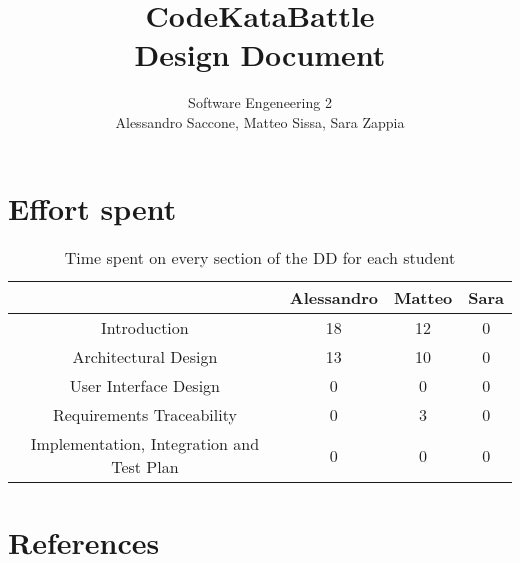 \documentclass[12pt,a4paper]{article}
\title{CodeKataBattle\\ Design Document}
\author{Software Engeneering 2\\
       Alessandro Saccone, Matteo Sissa, Sara Zappia}
\begin{document}
\maketitle

\newpage
\tableofcontents











\section{Effort spent}
\begin{table}[h]
  \centering
  \begin{tabular}{|c|c|c|c|}
    \hline
      & Alessandro & Matteo & Sara \\
    \hline
    Introduction & 18 & 12 & 0 \\
    \hline
    Architectural Design & 13 & 10 & 0 \\
    \hline
    User Interface Design & 0 & 0 & 0 \\ 
    \hline
    Requirements Traceability & 0 & 3 & 0  \\
    \hline
    Implementation, Integration and Test Plan & 0 & 0 & 0 \\
    \hline
    
  \end{tabular}
  \caption{Time spent on every section of the DD for each student}
  \label{tab:effort}
\end{table}

\section{References}
%
%
\end{document}
